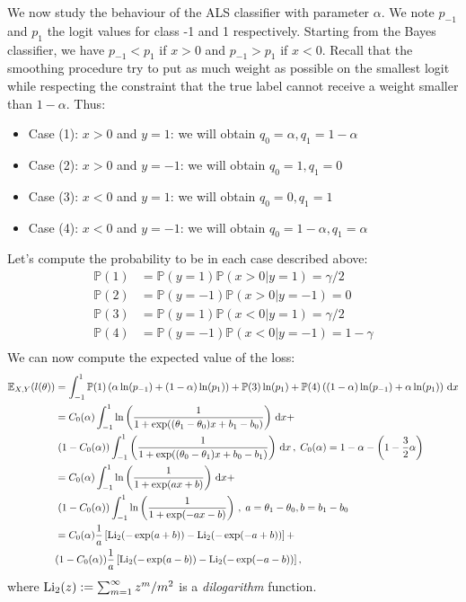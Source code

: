 We now study the behaviour of the ALS classifier with parameter $\alpha$. We
note $p_{-1}$ and $p_1$ the logit values for class -1 and 1 respectively. Starting
from the Bayes classifier, we have $p_{-1} < p_1$ if $x > 0$ and $p_{-1} > p_1$ if $x
< 0$. Recall that the smoothing procedure try to put as much weight as possible
on the smallest logit while respecting the constraint that the true label cannot
receive a weight smaller than $1-\alpha$. Thus:
\begin{itemize}
  \item Case (1): $x > 0$ and $y = 1$: we will obtain $q_0 = \alpha, q_1 = 1-\alpha$
  \item Case (2): $x > 0$ and $y = -1$: we will obtain $q_0 = 1, q_1 = 0$
  \item Case (3): $x < 0$ and $y = 1$: we will obtain $q_0 = 0, q_1 = 1$
  \item Case (4): $x < 0$ and $y = -1$: we will obtain $q_0 = 1-\alpha, q_1 = \alpha$
\end{itemize}
Let's compute the probability to be in each case described above:
\begin{align*}
\mathbb{P}(1) &= \mathbb{P}(y=1)\mathbb{P}(x>0|y=1) = \gamma / 2\\
\mathbb{P}(2) &= \mathbb{P}(y=-1)\mathbb{P}(x>0|y=-1) = 0 \\
\mathbb{P}(3) &= \mathbb{P}(y=1)\mathbb{P}(x<0|y=1) = \gamma / 2\\
\mathbb{P}(4) &= \mathbb{P}(y=-1)\mathbb{P}(x<0|y=-1) = 1-\gamma \\
\end{align*}
We can now compute the expected value of the loss:
\begin{eqnarray*}
\begin{split}
  \mathbb{E}_{X,Y}(l(\theta)) &= \int_{-1}^1 \mathbb{P}(1) \left( \alpha \ln
    (p_{-1})  + (1- \alpha)\ln(p_1) \right) + \mathbb{P}(3)\ln(p_1) +
  \mathbb{P}(4)\left( (1-\alpha) \ln(p_{-1}) + \alpha \ln(p_1) \right) \,
  \text{d}x \\
&= C_0(\alpha) \int_{-1}^1 \ln \left( \frac{1}{1 + \exp((\theta_1 - \theta_0)x +
    b_1 - b_0)} \right) \, \text{d}x + \\
& \; (1 - C_0(\alpha)) \int_{-1}^1 \left( \frac{1}{1 + \exp((\theta_0 -
    \theta_1)x + b_0 - b_1)} \right) \, \text{d}x \, , \; C_0(\alpha) = 1 -
\alpha - \left( 1 - \frac{3}{2} \alpha \right) \\
& = C_0(\alpha) \int_{-1}^1 \ln \left( \frac{1}{1 + \exp(ax+b)} \right) \,
\text{d}x + \\
& \; (1-C_0(\alpha)) \int_{-1}^1 \ln\left( \frac{1}{1 + \exp(-ax-b)} \right) \,
, \; a = \theta_1 - \theta_0 ,  b = b_1 - b_0 \\
& = C_0(\alpha) \frac{1}{a} \left[ \operatorname{Li}_2( - \exp(a+b) ) - \operatorname{Li}_2( - \exp(-a+b) )
\right] + \\
&(1-C_0(\alpha)) \frac{1}{a} \left[ \operatorname{Li}_2( - \exp(a-b) ) - \operatorname{Li}_2( - \exp(-a-b) )
\right],
\end{split}
\end{eqnarray*}
where $\operatorname{Li}_2(z) := \sum_{m=1}^\infty z^m/m^2$ is a \emph{dilogarithm} function.

